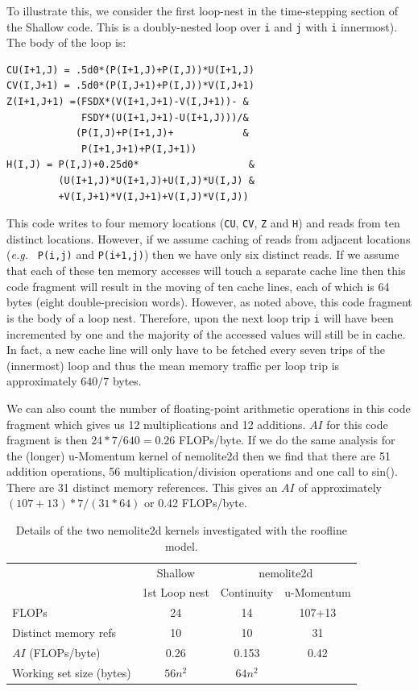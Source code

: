 \documentclass[12pt]{article}
\begin{document}
To illustrate this, we consider the first loop-nest in the
time-stepping section of the Shallow code. This is a doubly-nested
loop over {\tt i} and {\tt j} with {\tt i} innermost). The body of the
loop is:
\begin{verbatim}
CU(I+1,J) = .5d0*(P(I+1,J)+P(I,J))*U(I+1,J)
CV(I,J+1) = .5d0*(P(I,J+1)+P(I,J))*V(I,J+1)
Z(I+1,J+1) =(FSDX*(V(I+1,J+1)-V(I,J+1))- &
             FSDY*(U(I+1,J+1)-U(I+1,J)))/&
            (P(I,J)+P(I+1,J)+            &
             P(I+1,J+1)+P(I,J+1))
H(I,J) = P(I,J)+0.25d0*                   &
         (U(I+1,J)*U(I+1,J)+U(I,J)*U(I,J) & 
         +V(I,J+1)*V(I,J+1)+V(I,J)*V(I,J))
\end{verbatim}
This code writes to four memory locations ({\tt CU}, {\tt CV}, {\tt Z}
and {\tt H}) and reads from ten distinct locations.  However, if we
assume caching of reads from adjacent locations ({\it e.g.} {\tt
  P(i,j)} and {\tt P(i+1,j)}) then we have only six distinct reads.
If we assume that each of these ten memory accesses will touch a
separate cache line then this code fragment will result in the moving
of ten cache lines, each of which is 64 bytes (eight double-precision
words). However, as noted above, this code fragment is the body of a
loop nest. Therefore, upon the next loop trip {\tt i} will have been
incremented by one and the majority of the accessed values will still
be in cache. In fact, a new cache line will only have to be fetched
every seven trips of the (innermost) loop and thus the mean memory
traffic per loop trip is approximately $640/7$ bytes.

We can also count the number of floating-point arithmetic operations
in this code fragment which gives us 12 multiplications and 12
additions. $AI$ for this code fragment is then $24*7/640 = 0.26$
FLOPs/byte.  If we do the same analysis for the (longer) u-Momentum
kernel of nemolite2d then we find that there are 51 addition
operations, 56 multiplication/division operations and one call to
sin(). There are 31 distinct memory references. This gives an $AI$ of
approximately $(107+13)*7/(31*64)$ or 0.42 FLOPs/byte.

\begin{table}
  \begin{tabular}{l|c|c|c}
                           & Shallow & \multicolumn{2}{c}{nemolite2d} \\
                           & 1st Loop nest & Continuity & u-Momentum \\
\hline                                
FLOPs                      & 24      &    14      &   107+13   \\
Distinct memory refs       & 10      &    10      &   31       \\
$AI$ (FLOPs/byte)          & 0.26    &  0.153     &   0.42     \\
Working set size (bytes)   & $56n^2$ &  $64n^2$   &            \\
\end{tabular}
\caption{Details of the two nemolite2d kernels investigated with the
  roofline model.}
\label{TAB_kernel_details}
\end{table}
\end{document}
